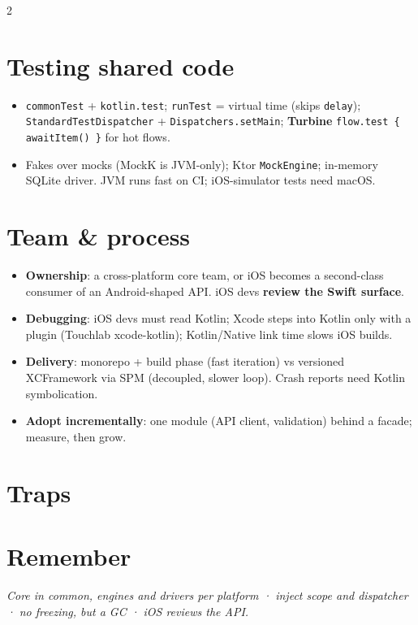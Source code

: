 \documentclass[8pt]{extarticle}
\begin{document}
\begin{multicols}{2}
\columnbreak

\section{Testing shared code}
\begin{itemize}\raggedright
  \item \texttt{commonTest} + \texttt{kotlin.test}; \texttt{runTest} = virtual time
        (skips \texttt{delay}); \texttt{StandardTestDispatcher} +
        \texttt{Dispatchers.setMain}; \textbf{Turbine} \texttt{flow.test \{ awaitItem() \}}
        for hot flows.
  \item Fakes over mocks (MockK is JVM-only); Ktor \texttt{MockEngine}; in-memory SQLite
        driver. JVM runs fast on CI; iOS-simulator tests need macOS.
\end{itemize}

\section{Team \& process}
\begin{itemize}\raggedright
  \item \textbf{Ownership}: a cross-platform core team, or iOS becomes a second-class
        consumer of an Android-shaped API. iOS devs \textbf{review the Swift surface}.
  \item \textbf{Debugging}: iOS devs must read Kotlin; Xcode steps into Kotlin only with a
        plugin (Touchlab xcode-kotlin); Kotlin/Native link time slows iOS builds.
  \item \textbf{Delivery}: monorepo + build phase (fast iteration) vs versioned XCFramework
        via SPM (decoupled, slower loop). Crash reports need Kotlin symbolication.
  \item \textbf{Adopt incrementally}: one module (API client, validation) behind a facade;
        measure, then grow.
\end{itemize}

\section{Traps}
\begin{itemize}\raggedright
\end{itemize}

\section{Remember}
\emph{Core in common, engines and drivers per platform · inject scope and dispatcher ·
no freezing, but a GC · iOS reviews the API.}


\end{multicols}

\end{document}
